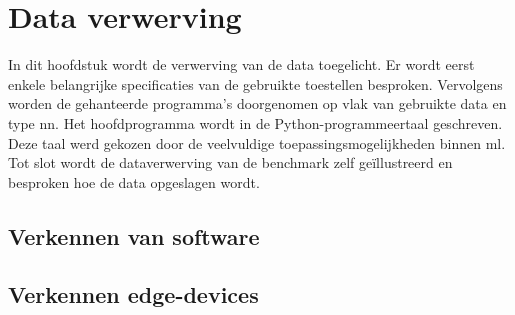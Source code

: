 \chapter{Data verwerving}

In dit hoofdstuk wordt de verwerving van de data toegelicht. Er wordt eerst enkele belangrijke specificaties van de gebruikte toestellen besproken. Vervolgens worden de gehanteerde programma's doorgenomen op vlak van gebruikte data en type \gls{nn}. Het hoofdprogramma wordt in de Python-programmeertaal geschreven. Deze taal werd gekozen door de veelvuldige toepassingsmogelijkheden binnen \gls{ml}. Tot slot wordt de dataverwerving van de benchmark zelf ge\"illustreerd en besproken hoe de data opgeslagen wordt.

\section{Verkennen van software}




\section{Verkennen edge-devices}

